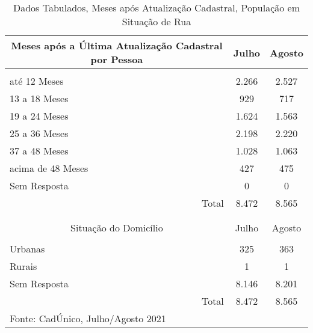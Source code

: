 \documentclass[12pt]{article}
\begin{document}
\begin{table}[htbp]
  \centering
  \caption{Dados Tabulados, Meses após Atualização Cadastral, População em Situação de Rua}
    \begin{tabular}{p{17.5em}rr}
    \hline
    \multicolumn{1}{c}{Meses após a Última Atualização Cadastral por Pessoa} & \multicolumn{1}{c}{Julho} & \multicolumn{1}{c}{Agosto} \\
    \midrule
    \multicolumn{1}{c}{} &      &  \\
    \multicolumn{1}{l}{até 12 Meses} & \multicolumn{1}{c}{\textcolor[rgb]{ .2,  .2,  .2}{2.266}} & \multicolumn{1}{c}{2.527} \\
    \multicolumn{1}{l}{13 a 18 Meses} & \multicolumn{1}{c}{\textcolor[rgb]{ .2,  .2,  .2}{929}} & \multicolumn{1}{c}{717} \\
    \multicolumn{1}{l}{19 a 24 Meses} & \multicolumn{1}{c}{\textcolor[rgb]{ .2,  .2,  .2}{1.624}} & \multicolumn{1}{c}{1.563} \\
    \multicolumn{1}{l}{25 a 36 Meses} & \multicolumn{1}{c}{\textcolor[rgb]{ .2,  .2,  .2}{2.198}} & \multicolumn{1}{c}{2.220} \\
    \multicolumn{1}{l}{37 a 48 Meses} & \multicolumn{1}{c}{\textcolor[rgb]{ .2,  .2,  .2}{1.028}} & \multicolumn{1}{c}{1.063} \\
    \multicolumn{1}{l}{acima de 48 Meses} & \multicolumn{1}{c}{\textcolor[rgb]{ .2,  .2,  .2}{427}} & \multicolumn{1}{c}{475} \\
    \multicolumn{1}{l}{Sem Resposta} & \multicolumn{1}{c}{\textcolor[rgb]{ .2,  .2,  .2}{0}} & \multicolumn{1}{c}{0} \\
    \midrule
    \multicolumn{1}{r}{Total} & \multicolumn{1}{c}{8.472} & \multicolumn{1}{c}{8.565} \\
    \midrule
    \multicolumn{1}{c}{} &      &  \\
    \multicolumn{1}{r}{} &      &  \\
    \midrule
    \multicolumn{1}{c}{Situação do Domicílio} & \multicolumn{1}{c}{Julho} & \multicolumn{1}{c}{Agosto} \\
    \midrule
    \multicolumn{1}{c}{} &      &  \\
    \multicolumn{1}{l}{Urbanas} & \multicolumn{1}{c}{325} & \multicolumn{1}{c}{363} \\
    \multicolumn{1}{l}{Rurais} & \multicolumn{1}{c}{1} & \multicolumn{1}{c}{1} \\
    \multicolumn{1}{l}{Sem Resposta} & \multicolumn{1}{c}{8.146} & \multicolumn{1}{c}{8.201} \\
    \midrule
    \multicolumn{1}{r}{Total} & \multicolumn{1}{c}{8.472} & \multicolumn{1}{c}{8.565} \\
    \midrule
    Fonte: CadÚnico, Julho/Agosto 2021 &      &  \\
    \end{tabular}%
  \label{tab:tab1}%
\end{table}%
\end{document}
